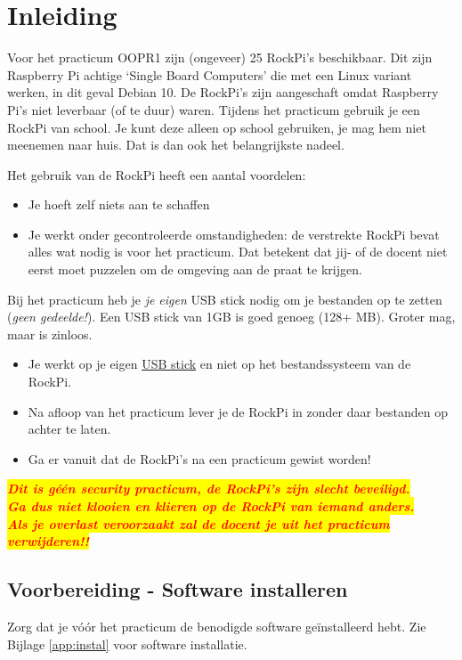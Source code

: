 \chapter{Inleiding}\label{chap:inl}
Voor het practicum OOPR1 zijn (ongeveer) 25 RockPi’s beschikbaar. Dit zijn Raspberry Pi achtige ‘Single Board Computers’ die met een Linux variant werken, in dit geval Debian 10. De RockPi’s zijn aangeschaft omdat Raspberry Pi’s niet leverbaar (of te duur) waren.
Tijdens het practicum gebruik je een RockPi van school. Je kunt deze alleen op school gebruiken, je mag hem niet meenemen naar huis. Dat is dan ook het belangrijkste nadeel.

Het gebruik van de RockPi heeft een aantal voordelen:
\begin{itemize}
\item Je hoeft zelf niets aan te schaffen
\item Je werkt onder gecontroleerde omstandigheden: de verstrekte RockPi bevat alles wat nodig is voor het practicum. Dat betekent dat jij- of de docent niet eerst moet puzzelen om de omgeving aan de praat te krijgen.
\end{itemize}

\hypertarget{USBinleiding}{}
Bij het practicum heb je \textit{je eigen} USB stick nodig om je bestanden op te zetten (\textit{geen gedeelde!}). Een USB stick van 1GB is goed genoeg (128+ MB). Groter mag, maar is zinloos.
\begin{itemize}
\item Je werkt op je eigen \hyperlink{chp:USBstick}{USB stick} en niet op het bestandssysteem van de RockPi. 
\item Na afloop van het practicum lever je de RockPi in zonder daar bestanden op achter te laten. 
\item Ga er vanuit dat de RockPi’s na een practicum gewist worden!
\end{itemize}
\colorbox{yellow}{\textcolor{red}{\textbf{\textit{Dit is géén security practicum, de RockPi's zijn slecht beveiligd.}}}}\\
\colorbox{yellow}{\textcolor{red}{\textbf{\textit{Ga dus niet klooien en klieren op de RockPi van iemand anders.}}}}\\
\colorbox{yellow}{\textcolor{red}{\textbf{\textit{Als je overlast veroorzaakt zal de docent je uit het practicum verwijderen!!}}}}

\section{Voorbereiding - Software installeren}
Zorg dat je vóór het practicum de benodigde software geïnstalleerd hebt.
Zie Bijlage \ref{app:instal} voor software installatie.
\newpage


